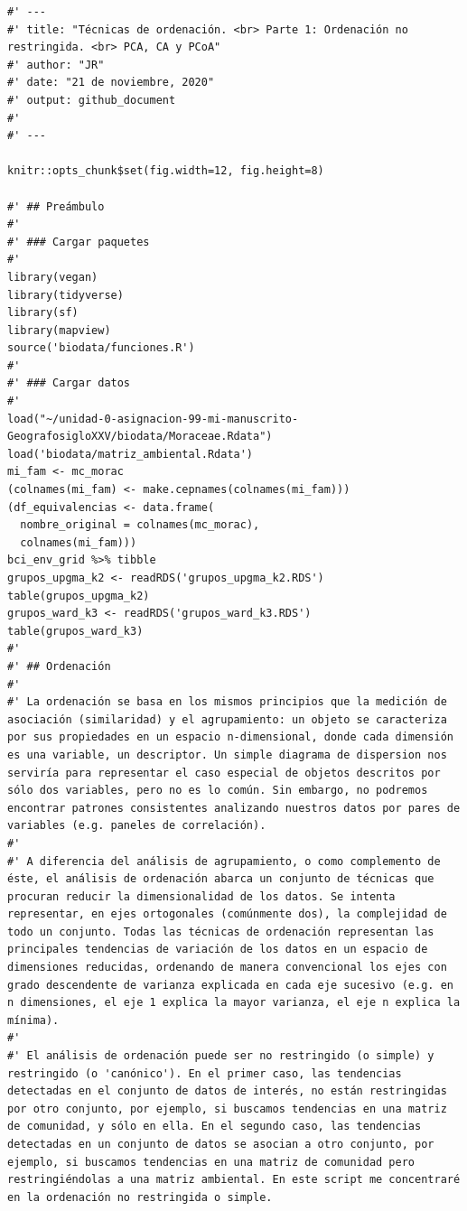 \documentclass[11pt,]{article}
\begin{document}
\begin{verbatim}
#' ---
#' title: "Técnicas de ordenación. <br> Parte 1: Ordenación no restringida. <br> PCA, CA y PCoA"
#' author: "JR"
#' date: "21 de noviembre, 2020"
#' output: github_document
#' 
#' ---

knitr::opts_chunk$set(fig.width=12, fig.height=8)

#' ## Preámbulo
#' 
#' ### Cargar paquetes
#' 
library(vegan)
library(tidyverse)
library(sf)
library(mapview)
source('biodata/funciones.R')
#' 
#' ### Cargar datos
#' 
load("~/unidad-0-asignacion-99-mi-manuscrito-GeografosigloXXV/biodata/Moraceae.Rdata")
load('biodata/matriz_ambiental.Rdata')
mi_fam <- mc_morac
(colnames(mi_fam) <- make.cepnames(colnames(mi_fam)))
(df_equivalencias <- data.frame(
  nombre_original = colnames(mc_morac),
  colnames(mi_fam)))
bci_env_grid %>% tibble
grupos_upgma_k2 <- readRDS('grupos_upgma_k2.RDS')
table(grupos_upgma_k2)
grupos_ward_k3 <- readRDS('grupos_ward_k3.RDS')
table(grupos_ward_k3)
#' 
#' ## Ordenación
#' 
#' La ordenación se basa en los mismos principios que la medición de asociación (similaridad) y el agrupamiento: un objeto se caracteriza por sus propiedades en un espacio n-dimensional, donde cada dimensión es una variable, un descriptor. Un simple diagrama de dispersion nos serviría para representar el caso especial de objetos descritos por sólo dos variables, pero no es lo común. Sin embargo, no podremos encontrar patrones consistentes analizando nuestros datos por pares de variables (e.g. paneles de correlación).
#' 
#' A diferencia del análisis de agrupamiento, o como complemento de éste, el análisis de ordenación abarca un conjunto de técnicas que procuran reducir la dimensionalidad de los datos. Se intenta representar, en ejes ortogonales (comúnmente dos), la complejidad de todo un conjunto. Todas las técnicas de ordenación representan las principales tendencias de variación de los datos en un espacio de dimensiones reducidas, ordenando de manera convencional los ejes con grado descendente de varianza explicada en cada eje sucesivo (e.g. en n dimensiones, el eje 1 explica la mayor varianza, el eje n explica la mínima).
#' 
#' El análisis de ordenación puede ser no restringido (o simple) y restringido (o 'canónico'). En el primer caso, las tendencias detectadas en el conjunto de datos de interés, no están restringidas por otro conjunto, por ejemplo, si buscamos tendencias en una matriz de comunidad, y sólo en ella. En el segundo caso, las tendencias detectadas en un conjunto de datos se asocian a otro conjunto, por ejemplo, si buscamos tendencias en una matriz de comunidad pero restringiéndolas a una matriz ambiental. En este script me concentraré en la ordenación no restringida o simple.

\end{verbatim}
\end{document}
